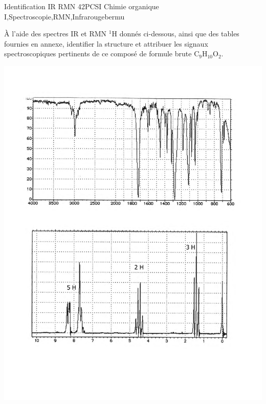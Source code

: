 \begin{exercise}{Identification IR RMN 4}{2}{PCSI}
{Chimie organique I,Spectroscopie,RMN,Infrarouge}{bermu}

À l'aide des spectres IR et RMN $^{1}$H donnés ci-dessous, ainsi que des tables fournies en annexe, identifier la structure et attribuer les signaux spectroscopiques pertinents de ce composé de formule brute $\mathrm{C_9H_{10}O_2}$.
 
\vspace{2em}
 
\includegraphics[width=\linewidth]{chimiePC/orga/IR_RMN_4.pdf}

\end{exercise}

\begin{solution}
\begin{center}
\end{center}
\end{solution}

